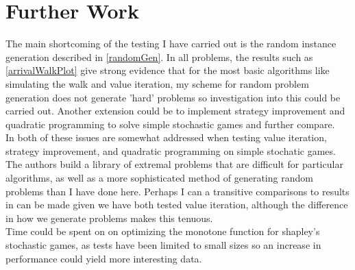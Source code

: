 \section{Further Work}
The main shortcoming of the testing I have carried out is the random instance generation described in \cref{randomGen}.
In all problems, the results such as \cref{arrivalWalkPlot} give strong evidence
that for the most basic algorithms like simulating the walk and value iteration,
my scheme for random problem generation does not generate 'hard' problems so investigation
into this could be carried out. Another extension
could be to implement strategy improvement and quadratic programming
to solve simple stochastic games and further compare.\\
In \citep{valueIterationTest} both of these issues are somewhat addressed when testing value iteration,
strategy improvement, and quadratic programming on simple stochatic games. The authors
build a library of extremal problems that are difficult for particular algorithms, as well as a more
sophisticated method of generating random problems than I have done here. Perhaps I can a transitive
comparisons to results in \citep{valueIterationTest} can be made given
we have both tested value iteration, although the difference in how we generate problems makes this tenuous. \\
Time could be spent on on optimizing the monotone function for shapley's stochastic games,
as tests have been limited to small sizes so an increase in performance could yield more interesting data.
